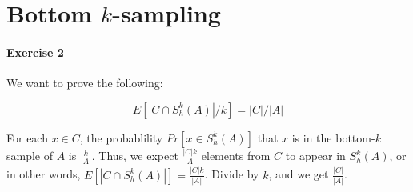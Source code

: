\section{Bottom $k$-sampling}

\paragraph{Exercise 2}
We want to prove the following:

\[
    E[|C \cap S^k_h(A)|/k] = |C|/|A|
\]

For each $x \in C$, the probablility $Pr[x \in S^k_h(A)]$ that $x$ is in the bottom-$k$ sample of $A$ is $\frac{k}{|A|}$. Thus, we expect $\frac{|C|k}{|A|}$ elements from $C$ to appear in $S^k_h(A)$, or in other words, $E[|C \cap S^k_h(A)|] = \frac{|C|k}{|A|}$. Divide by $k$, and we get $\frac{|C|}{|A|}$. 
